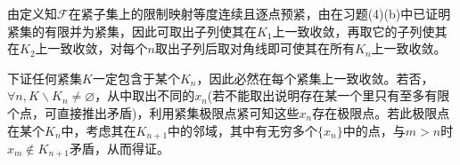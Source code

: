 \documentclass[a4paper,UTF8,fontset=windows]{ctexart}
\begin{document}
\begin{enumerate}[(1)]
\begin{enumerate}[(a)]
    由定义知$\mathcal{F}$在紧子集上的限制映射等度连续且逐点预紧，由在习题(4)(b)中已证明紧集的有限并为紧集，因此可取出子列使其在$K_1$上一致收敛，再取它的子列使其在$K_2$上一致收敛，对每个$n$取出子列后取对角线即可使其在所有$K_n$上一致收敛。
    
    下证任何紧集$K$一定包含于某个$K_n$，因此必然在每个紧集上一致收敛。若否，$\forall n,K\backslash K_n\ne\varnothing$，从中取出不同的$x_n$(若不能取出说明存在某一个里只有至多有限个点，可直接推出矛盾)，利用紧集极限点紧可知这些$x_n$存在极限点。若此极限点在某个$K_n$中，考虑其在$K_{n+1}$中的邻域，其中有无穷多个$\{x_n\}$中的点，与$m>n$时$x_m\notin K_{n+1}$矛盾，从而得证。
    \end{enumerate}
\end{enumerate}

\subsection{}
\end{document}
